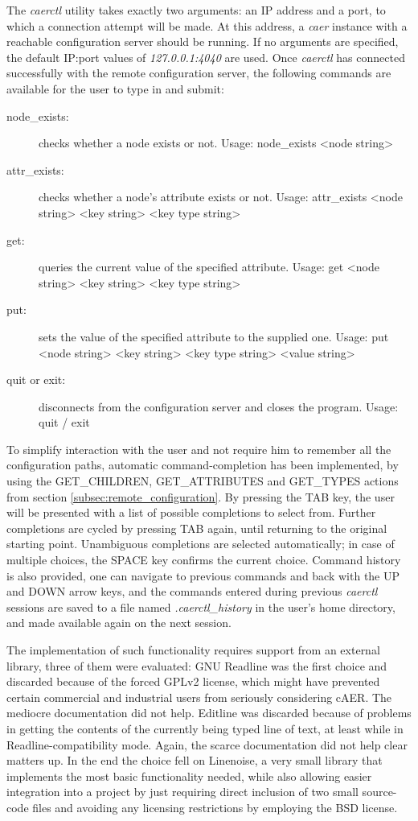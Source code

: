 \documentclass[a4paper,12pt]{report}
\begin{document}
The \emph{caerctl} utility takes exactly two arguments: an IP address and a port, to which a connection attempt will be made. At this address, a \emph{caer} instance with a reachable configuration server should be running.
If no arguments are specified, the default IP:port values of \emph{127.0.0.1:4040} are used.
Once \emph{caerctl} has connected successfully with the remote configuration server, the following commands are available for the user to type in and submit:
\begin{description}
\item[node\_exists:] checks whether a node exists or not.
\subitem Usage: node\_exists <node string>
\item[attr\_exists:] checks whether a node's attribute exists or not.
\subitem Usage: attr\_exists <node string> <key string> <key type string>
\item[get:] queries the current value of the specified attribute.
\subitem Usage: get <node string> <key string> <key type string>
\item[put:] sets the value of the specified attribute to the supplied one.
\subitem Usage: put <node string> <key string> <key type string> <value string>
\item[quit or exit:] disconnects from the configuration server and closes the program.
\subitem Usage: quit / exit
\end{description}

To simplify interaction with the user and not require him to remember all the configuration paths, automatic command-completion has been implemented, by using the GET\_CHILDREN, GET\_ATTRIBUTES and GET\_TYPES actions from section \ref{subsec:remote_configuration}.
By pressing the TAB key, the user will be presented with a list of possible completions to select from. Further completions are cycled by pressing TAB again, until returning to the original starting point. Unambiguous completions are selected automatically; in case of multiple choices, the SPACE key confirms the current choice.
Command history is also provided, one can navigate to previous commands and back with the UP and DOWN arrow keys, and the commands entered during previous \emph{caerctl} sessions are saved to a file named \emph{.caerctl\_history} in the user's home directory, and made available again on the next session.

The implementation of such functionality requires support from an external library, three of them were evaluated: GNU Readline was the first choice and discarded because of the forced GPLv2 license, which might have prevented certain commercial and industrial users from seriously considering cAER. The mediocre documentation did not help. Editline was discarded because of problems in getting the contents of the currently being typed line of text, at least while in Readline-compatibility mode. Again, the scarce documentation did not help clear matters up.
In the end the choice fell on Linenoise, a very small library that implements the most basic functionality needed, while also allowing easier integration into a project by just requiring direct inclusion of two small source-code files and avoiding any licensing restrictions by employing the BSD license.
\end{document}
